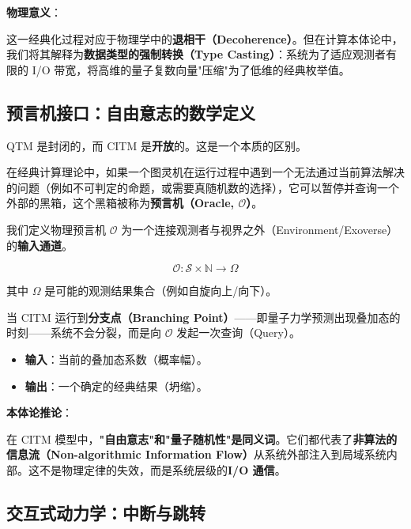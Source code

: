 \textbf{物理意义}：

这一经典化过程对应于物理学中的\textbf{退相干（Decoherence）}。但在计算本体论中，我们将其解释为\textbf{数据类型的强制转换（Type Casting）}：系统为了适应观测者有限的 I/O 带宽，将高维的量子复数向量"压缩"为了低维的经典枚举值。

\subsection{预言机接口：自由意志的数学定义}

QTM 是封闭的，而 CITM 是\textbf{开放}的。这是一个本质的区别。

在经典计算理论中，如果一个图灵机在运行过程中遇到一个无法通过当前算法解决的问题（例如不可判定的命题，或需要真随机数的选择），它可以暂停并查询一个外部的黑箱，这个黑箱被称为\textbf{预言机（Oracle, $\mathcal{O}$）}。

\begin{definition}[物理预言机]
我们定义物理预言机 $\mathcal{O}$ 为一个连接观测者与视界之外（Environment/Exoverse）的\textbf{输入通道}。

\begin{equation}
\mathcal{O}: \mathcal{S} \times \mathbb{N} \to \Omega
\end{equation}

其中 $\Omega$ 是可能的观测结果集合（例如自旋向上/向下）。
\end{definition}

当 CITM 运行到\textbf{分支点（Branching Point）}——即量子力学预测出现叠加态的时刻——系统不会分裂，而是向 $\mathcal{O}$ 发起一次查询（Query）。

\begin{itemize}
\item \textbf{输入}：当前的叠加态系数（概率幅）。

\item \textbf{输出}：一个确定的经典结果（坍缩）。
\end{itemize}

\textbf{本体论推论}：

在 CITM 模型中，\textbf{"自由意志"和"量子随机性"是同义词}。它们都代表了\textbf{非算法的信息流（Non-algorithmic Information Flow）}从系统外部注入到局域系统内部。这不是物理定律的失效，而是系统层级的\textbf{I/O 通信}。

\subsection{交互式动力学：中断与跳转}

